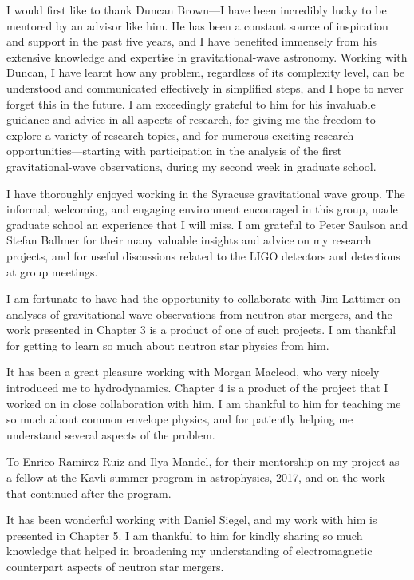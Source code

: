 I would first like to thank Duncan Brown---I have been incredibly lucky to be mentored by an advisor like him. He has been a constant source of inspiration and support in the past five years, and I have benefited immensely from his extensive knowledge and expertise in gravitational-wave astronomy. Working with Duncan, I have learnt how any problem, regardless of its complexity level, can be understood and communicated effectively in simplified steps, and I hope to never forget this in the future. I am exceedingly grateful to him for his invaluable guidance and advice in all aspects of research, for giving me the freedom to explore a variety of research topics, and for numerous exciting research opportunities---starting with participation in the analysis of the first gravitational-wave observations, during my second week in graduate school.

I have thoroughly enjoyed working in the Syracuse gravitational wave group. The informal, welcoming, and engaging environment encouraged in this group, made graduate school an experience that I will miss. I am grateful to Peter Saulson and Stefan Ballmer for their many valuable insights and advice on my research projects, and for useful discussions related to the LIGO detectors and detections at group meetings.

I am fortunate to have had the opportunity to collaborate with Jim Lattimer on analyses of gravitational-wave observations from neutron star mergers, and the work presented in Chapter 3 is a product of one of such projects. I am thankful for getting to learn so much about neutron star physics from him.

It has been a great pleasure working with Morgan Macleod, who very nicely introduced me to hydrodynamics. Chapter 4 is a product of the project that I worked on in close collaboration with him. I am thankful to him for teaching me so much about common envelope physics, and for patiently helping me understand several aspects of the problem.

To Enrico Ramirez-Ruiz and Ilya Mandel, for their mentorship on my project as a fellow at the Kavli summer program in astrophysics, 2017, and on the work that continued after the program.

It has been wonderful working with Daniel Siegel, and my work with him is presented in Chapter 5. I am thankful to him for kindly sharing so much knowledge that helped in broadening my understanding of electromagnetic counterpart aspects of neutron star mergers.

